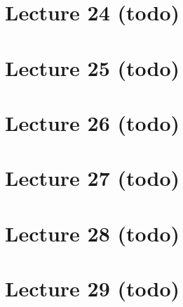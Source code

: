 \hypertarget{lecture-24-todo}{%
\section{Lecture 24 (todo)}\label{lecture-24-todo}}

\hypertarget{lecture-25-todo}{%
\section{Lecture 25 (todo)}\label{lecture-25-todo}}

\hypertarget{lecture-26-todo}{%
\section{Lecture 26 (todo)}\label{lecture-26-todo}}

\hypertarget{lecture-27-todo}{%
\section{Lecture 27 (todo)}\label{lecture-27-todo}}

\hypertarget{lecture-28-todo}{%
\section{Lecture 28 (todo)}\label{lecture-28-todo}}

\hypertarget{lecture-29-todo}{%
\section{Lecture 29 (todo)}\label{lecture-29-todo}}

\cleardoublepage

\renewcommand{\listtheoremname}{}
\listoftheorems[ignoreall,show={definition}, numwidth=3.5em]
\cleardoublepage

\renewcommand{\listtheoremname}{}
\listoftheorems[ignoreall,show={theorem,proposition}, numwidth=3.5em]
\cleardoublepage

\renewcommand{\listtheoremname}{}
\listoftheorems[ignoreall,show={exercise}, numwidth=3.5em]
\cleardoublepage

\listoffigures
\cleardoublepage


\printbibliography[title=Bibliography]



